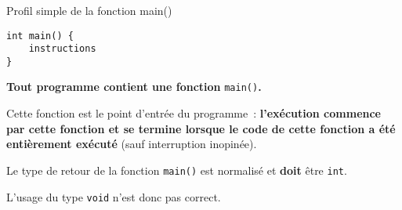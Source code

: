 \begin{frame}[containsverbatim]
  \frametitle{\secname}
  \framesubtitle{\subsecname}

  \begin{block}{Profil simple de la fonction main()}
    \begin{verbatim}
int main() {
    instructions
}
    \end{verbatim}
  \end{block}

  \par
  \textbf{Tout programme contient une fonction }\verb|main()|\textbf{.}
  \vspace{0.3cm}
  \par
  Cette fonction est le point d'entrée du programme~: 
  \textbf{l'exécution commence par cette fonction et se termine lorsque le code de cette fonction a été entièrement exécuté} (sauf interruption inopinée).
  \vspace{0.3cm}
  \par
  Le type de retour de la fonction \verb|main()| est normalisé et \textbf{doit} être \verb|int|.
  \vspace{0.3cm}
  \par
  {\small L'usage du type \verb|void| n'est donc pas correct.}
\end{frame}

